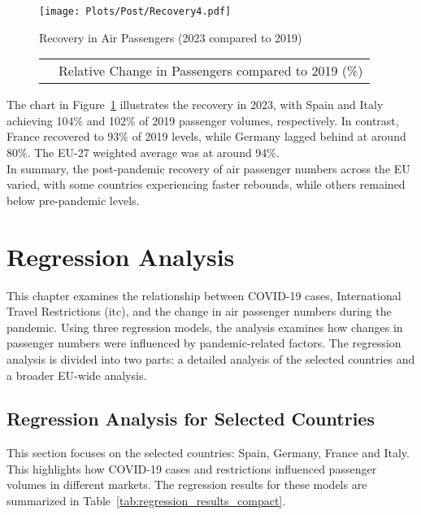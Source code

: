 \documentclass[12pt,onehalfspacing,headsepline,oneside,openright,a4paper, fleqn]{report}
\begin{document}
\begin{figure}[H]
    \centering
    \caption{Recovery in Air Passengers (2023 compared to 2019)}
    \label{fig:passenger_recovery}
	\texttt{[image: Plots/Post/Recovery4.pdf]}
\end{figure}

\begin{figure}[H]
\centering
\begin{tabular}{c l}
\fbox{\textcolor{blueColor}{\rule{1em}{1em}}} & Relative Change in Passengers compared to 2019 (\%) \\[5pt]
\end{tabular}
\end{figure}

The chart in Figure~\ref{fig:passenger_recovery} illustrates the recovery in 2023, with Spain and Italy achieving 104\% and 102\% of 2019 passenger volumes, respectively. In contrast, France recovered to 93\% of 2019 levels, while Germany lagged behind at around 80\%. The EU-27 weighted average was at around 94\%.
\\

In summary, the post-pandemic recovery of air passenger numbers across the EU varied, with some countries experiencing faster rebounds, while others remained below pre-pandemic levels.


\newpage

\section{Regression Analysis}
\label{sec:regression analysis}


This chapter examines the relationship between COVID-19 cases, International Travel Restrictions (\gls{itc}), and the change in air passenger numbers during the pandemic. Using three regression models, the analysis examines how changes in passenger numbers were influenced by pandemic-related factors. The regression analysis is divided into two parts: a detailed analysis of the selected countries and a broader EU-wide analysis.  


\subsection*{Regression Analysis for Selected Countries}

This section focuses on the selected countries: Spain, Germany, France and Italy. This highlights how COVID-19 cases and restrictions influenced passenger volumes in different markets. The regression results for these models are summarized in Table~\ref{tab:regression_results_compact}.
\end{document}
